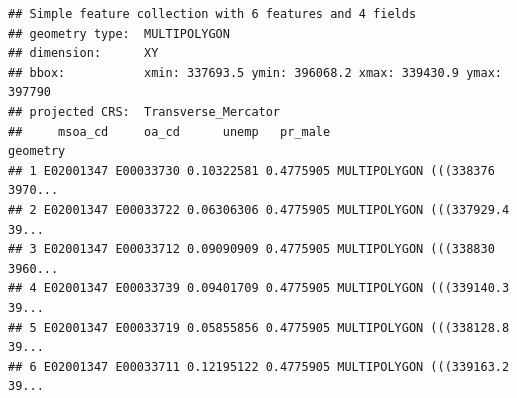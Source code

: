 \documentclass[
]{book}
\newenvironment{Shaded}{\begin{snugshade}}{\end{snugshade}}
\newcommand{\CommentTok}[1]{\textcolor[rgb]{0.56,0.35,0.01}{\textit{#1}}}
\newcommand{\DataTypeTok}[1]{\textcolor[rgb]{0.13,0.29,0.53}{#1}}
\newcommand{\DecValTok}[1]{\textcolor[rgb]{0.00,0.00,0.81}{#1}}
\newcommand{\KeywordTok}[1]{\textcolor[rgb]{0.13,0.29,0.53}{\textbf{#1}}}
\newcommand{\NormalTok}[1]{#1}
\newcommand{\OperatorTok}[1]{\textcolor[rgb]{0.81,0.36,0.00}{\textbf{#1}}}
\newcommand{\OtherTok}[1]{\textcolor[rgb]{0.56,0.35,0.01}{#1}}
\newcommand{\StringTok}[1]{\textcolor[rgb]{0.31,0.60,0.02}{#1}}
\begin{document}
\begin{Shaded}
\end{Shaded}

\begin{verbatim}
## Simple feature collection with 6 features and 4 fields
## geometry type:  MULTIPOLYGON
## dimension:      XY
## bbox:           xmin: 337693.5 ymin: 396068.2 xmax: 339430.9 ymax: 397790
## projected CRS:  Transverse_Mercator
##     msoa_cd     oa_cd      unemp   pr_male                       geometry
## 1 E02001347 E00033730 0.10322581 0.4775905 MULTIPOLYGON (((338376 3970...
## 2 E02001347 E00033722 0.06306306 0.4775905 MULTIPOLYGON (((337929.4 39...
## 3 E02001347 E00033712 0.09090909 0.4775905 MULTIPOLYGON (((338830 3960...
## 4 E02001347 E00033739 0.09401709 0.4775905 MULTIPOLYGON (((339140.3 39...
## 5 E02001347 E00033719 0.05855856 0.4775905 MULTIPOLYGON (((338128.8 39...
## 6 E02001347 E00033711 0.12195122 0.4775905 MULTIPOLYGON (((339163.2 39...
\end{verbatim}
\end{document}
